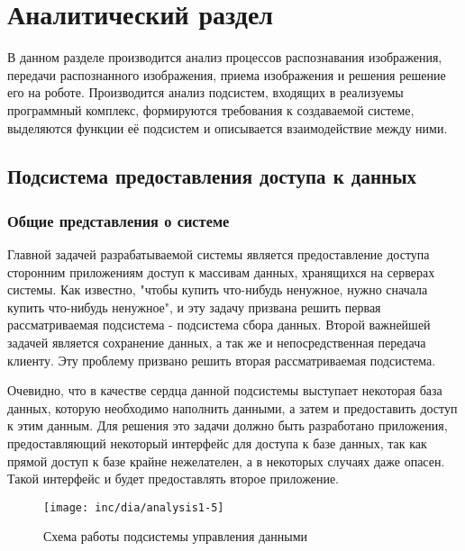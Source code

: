 \chapter{Аналитический раздел}
\label{cha:analysis}
%
%
В данном разделе производится анализ процессов распознавания изображения, передачи распознанного изображения, приема изображения и  решения решение его на роботе.
Производится анализ подсистем, входящих в реализуемы программный комплекс, формируются требования к создаваемой системе, выделяются функции её подсистем и описывается взаимодействие между ними.


\section{Подсистема предоставления доступа к данных}

\subsection{Общие представления о системе}

Главной задачей разрабатываемой системы является предоставление доступа сторонним приложениям доступ к массивам данных, хранящихся на серверах системы. Как известно, "чтобы купить что-нибудь ненужное, нужно сначала купить что-нибудь ненужное", и эту задачу призвана решить первая рассматриваемая подсистема - подсистема сбора данных. Второй важнейшей задачей является сохранение данных, а так же и непосредственная передача клиенту. Эту проблему призвано решить вторая рассматриваемая подсистема.

Очевидно, что в качестве сердца данной подсистемы выступает некоторая база данных, которую необходимо наполнить данными, а затем и предоставить доступ к этим данным. Для решения это задачи должно быть разработано приложения, предоставляющий некоторый интерфейс для доступа к базе данных, так как прямой доступ к базе крайне нежелателен, а в некоторых случаях даже опасен. Такой интерфейс и будет предоставлять второе приложение.

\begin{figure}
  \centering
  \texttt{[image: inc/dia/analysis1-5]}
  \caption{Схема работы подсистемы управления данными}
  \label{fig:fig05}
\end{figure}


